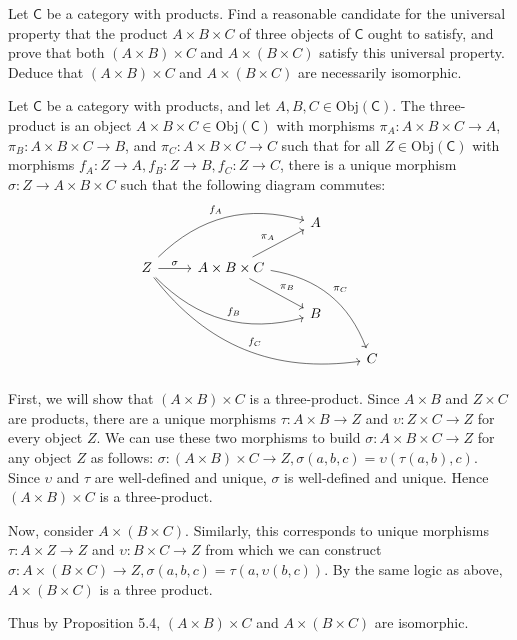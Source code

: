 \documentclass[12pt,letterpaper,boxed]{hmcpset}
\newcommand{\Obj}{\mathrm{Obj}}
\begin{document}
\begin{problem}[5.9]
	Let $\mathsf{C}$ be a category with products. Find a reasonable candidate for the
	universal property that the product $A\times B\times C$ of three objects of $\mathsf{C}$
	ought to satisfy, and prove that both $(A\times B)\times C$ and $A\times
	(B\times C)$ satisfy this universal property. Deduce that $(A\times B)\times C$
	and $A\times (B\times C)$ are necessarily isomorphic.
\end{problem}
\begin{solution}
	Let $\mathsf{C}$ be a category with products, and let $A,B,C\in\Obj(\mathsf{C})$. The
	three-product is an object ${A\times B\times C}\in\Obj(\mathsf{C})$ with morphisms $\pi_A:{A\times B\times C}\to A$,
	$\pi_B:{A\times B\times C}\to B$, and $\pi_C:{A\times B\times C}\to C$ such that for all $Z\in\Obj(\mathsf{C})$ with
	morphisms $f_A:Z\to A,f_B:Z\to B,f_C:Z\to C$, there is a unique morphism
	$\sigma:Z\to{A\times B\times C}$ such that the following diagram commutes:
	\[\begin{tikzcd}
	&&A \\
	Z\arrow[r,"\sigma"]\arrow[urr,bend left,"f_A"]\arrow[drr,bend right,"f_B"]\arrow[ddrrr,bend right,"f_C"]&
	{A\times B\times C}\arrow[ur,"\pi_A"]\arrow[dr,"\pi_B"]\arrow[ddrr,bend left,"\pi_C"] \\
	&&B \\
	&&&C
	\end{tikzcd}\]
	
	First, we will show that $(A\times B)\times C$ is a three-product. Since
	$A\times B$ and $Z\times C$ are products, there are a unique morphisms
	$\tau:A\times B\to Z$ and $\upsilon:Z\times C\to Z$ for every object $Z$.  We
	can use these two morphisms to build $\sigma:{A\times B\times C}\to Z$ for any object $Z$ as
	follows: $\sigma:(A\times B)\times C\to Z, \sigma(a,b,c)=\upsilon(\tau(a,b),c)$.
	Since $\upsilon$ and $\tau$ are well-defined and unique, $\sigma$ is
	well-defined and unique. Hence $(A\times B)\times C$ is a three-product.
	
	Now, consider $A\times(B\times C)$. Similarly, this corresponds to unique
	morphisms $\tau:A\times Z\to Z$ and $\upsilon:B\times C\to Z$ from which we can
	construct $\sigma:A\times(B\times C)\to Z,\sigma(a,b,c)=\tau(a,\upsilon(b,c))$.
	By the same logic as above, $A\times(B\times C)$ is a three product.
	
	Thus by Proposition 5.4, $(A\times B)\times C$ and $A\times(B\times C)$ are
	isomorphic.
\end{solution}
\end{document}
